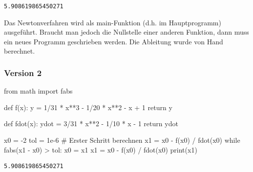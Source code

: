 \documentclass[
  letterpaper,
  DIV=11,
  oneside]{scrreprt}
\newenvironment{Shaded}{\begin{snugshade}}{\end{snugshade}}
\newcommand{\BuiltInTok}[1]{\textcolor[rgb]{0.00,0.23,0.31}{#1}}
\newcommand{\CommentTok}[1]{\textcolor[rgb]{0.37,0.37,0.37}{#1}}
\newcommand{\ControlFlowTok}[1]{\textcolor[rgb]{0.00,0.23,0.31}{#1}}
\newcommand{\DecValTok}[1]{\textcolor[rgb]{0.68,0.00,0.00}{#1}}
\newcommand{\FloatTok}[1]{\textcolor[rgb]{0.68,0.00,0.00}{#1}}
\newcommand{\ImportTok}[1]{\textcolor[rgb]{0.00,0.46,0.62}{#1}}
\newcommand{\KeywordTok}[1]{\textcolor[rgb]{0.00,0.23,0.31}{#1}}
\newcommand{\NormalTok}[1]{\textcolor[rgb]{0.00,0.23,0.31}{#1}}
\newcommand{\OperatorTok}[1]{\textcolor[rgb]{0.37,0.37,0.37}{#1}}
\theoremstyle{definition}
\theoremstyle{definition}
\theoremstyle{remark}
\begin{document}
\begin{tcolorbox}
\begin{verbatim}
5.908619865450271
\end{verbatim}

Das Newtonverfahren wird als main-Funktion (d.h. im Hauptprogramm)
ausgeführt. Braucht man jedoch die Nullstelle einer anderen Funktion,
dann muss ein neues Programm geschrieben werden. Die Ableitung wurde von
Hand berechnet.

\hypertarget{version-2}{%
\subsubsection{Version 2}\label{version-2}}

\begin{Shaded}
\begin{Highlighting}[]
\ImportTok{from}\NormalTok{ math }\ImportTok{import}\NormalTok{ fabs}

\KeywordTok{def}\NormalTok{ f(x):}
\NormalTok{    y }\OperatorTok{=} \DecValTok{1}\OperatorTok{/}\DecValTok{31} \OperatorTok{*}\NormalTok{ x}\OperatorTok{**}\DecValTok{3} \OperatorTok{{-}} \DecValTok{1}\OperatorTok{/}\DecValTok{20} \OperatorTok{*}\NormalTok{ x}\OperatorTok{**}\DecValTok{2} \OperatorTok{{-}}\NormalTok{ x }\OperatorTok{+} \DecValTok{1}
    \ControlFlowTok{return}\NormalTok{ y}

\KeywordTok{def}\NormalTok{ fdot(x):}
\NormalTok{    ydot }\OperatorTok{=} \DecValTok{3}\OperatorTok{/}\DecValTok{31} \OperatorTok{*}\NormalTok{ x}\OperatorTok{**}\DecValTok{2} \OperatorTok{{-}} \DecValTok{1}\OperatorTok{/}\DecValTok{10} \OperatorTok{*}\NormalTok{ x }\OperatorTok{{-}} \DecValTok{1}
    \ControlFlowTok{return}\NormalTok{ ydot}

\NormalTok{x0 }\OperatorTok{=} \OperatorTok{{-}}\DecValTok{2}
\NormalTok{tol }\OperatorTok{=} \FloatTok{1e{-}6}
\CommentTok{\# Erster Schritt berechnen}
\NormalTok{x1 }\OperatorTok{=}\NormalTok{ x0 }\OperatorTok{{-}}\NormalTok{ f(x0) }\OperatorTok{/}\NormalTok{ fdot(x0)}
\ControlFlowTok{while}\NormalTok{ fabs(x1 }\OperatorTok{{-}}\NormalTok{ x0) }\OperatorTok{\textgreater{}}\NormalTok{ tol:}
\NormalTok{    x0 }\OperatorTok{=}\NormalTok{ x1}
\NormalTok{    x1 }\OperatorTok{=}\NormalTok{ x0 }\OperatorTok{{-}}\NormalTok{ f(x0) }\OperatorTok{/}\NormalTok{ fdot(x0)}
\BuiltInTok{print}\NormalTok{(x1)}
\end{Highlighting}
\end{Shaded}

\begin{verbatim}
5.908619865450271
\end{verbatim}


\end{tcolorbox}
\end{document}
